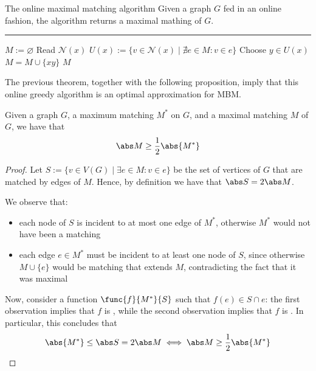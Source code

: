 \documentclass[a4paper, 12pt]{report}
\begin{document}
    \begin{framedalgo}{The online maximal matching algorithm}
        Given a graph $G$ fed in an online fashion, the algorithm returns a maximal mathing of $G$. \\
        \hrule

        \quad
        \begin{algorithmic}[1]
                \State $M := \varnothing$
                    \State Read $\mathcal N(x)$
                    \State $U(x) := \{v \in \mathcal N(x) \mid \nexists e \in M : v \in e\}$
                        \State Choose $y \in U(x)$
                        \State $M = M \cup \{xy\}$
                    \EndIf
                \EndWhile
                \State {} $M$
            \EndFunction
        \end{algorithmic}
    \end{framedalgo}

    The previous theorem, together with the following proposition, imply that this online greedy algorithm is an optimal approximation for MBM.

    \begin{framedprop}{}
        Given a graph $G$, a maximum matching $M^*$ on $G$, and a maximal matching $M$ of $G$, we have that $$\abs M \ge \dfrac{1}{2} \abs{M^*}$$
    \end{framedprop}

    \begin{proof}
        Let $S := \{v \in V(G) \mid \exists e \in M : v \in e\}$ be the set of vertices of $G$ that are matched by edges of $M$. Hence, by definition we have that $\abs S = 2 \abs M$.

        We observe that:

        \begin{itemize}
            \item each node of $S$ is incident to at most one edge of $M^*$, otherwise $M^*$ would not have been a matching
            \item each edge $e \in M^*$ must be incident to at least one node of $S$, since otherwise $M \cup \{e\}$ would be matching that extends $M$, contradicting the fact that it was maximal
        \end{itemize}

        Now, consider a function $\func{f}{M^*}{S}$ such that $f(e) \in S \cap e$: the first observation implies that $f$ is , while the second observation implies that $f$ is . In particular, this concludes that $$\abs{M^*} \le \abs S = 2 \abs M \iff \abs M \ge \dfrac{1}{2} \abs{M^*}$$
    \end{proof}
\end{document}
